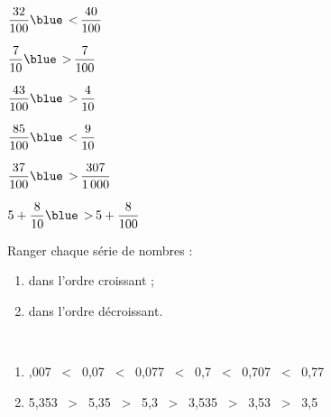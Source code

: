 \begin{colonne*exercice}
\begin{corrige}
   \begin{colenumerate}{2}
      \item $\dfrac{32}{100} {\blue\,<\,} \dfrac{40}{100}$ \medskip
      \item $\dfrac{7}{10} {\blue\,>\,} \dfrac{7}{100}$ \medskip
      \item $\dfrac{43}{100} {\blue\,>\,} \dfrac{4}{10}$ \medskip
      \item $\dfrac{85}{100} {\blue\,<\,} \dfrac{9}{10}$
      \item $\dfrac{37}{100} {\blue\,>\,} \dfrac{307}{1\,000}$
      \item $5+\dfrac{8}{10} {\blue\,>\,} 5+\dfrac{8}{100}$
   \end{colenumerate}
\end{corrige}

\bigskip


\begin{exercice} %
   Ranger chaque série de nombres :
   \begin{enumerate}
      \item dans l'ordre croissant ; \\ [1mm]
         \;  \;  \;  \;  \;  \medskip
      \item dans l'ordre décroissant. \\ [1mm]
         \;  \;  \;  \;  \;  \medskip
   \end{enumerate}
\end{exercice}

\begin{corrige}
   \ \\ [-5mm]
   \begin{enumerate}
      \item {},007 \, < \, 0,07 \, < \, 0,077 \, < \, 0,7 \, < \, 0,707 \, < \, 0,77 \smallskip
      \item 5,353 \, > \, 5,35 \, > \, 5,3 \, > \, 3,535 \, > \, 3,53 \, > \, 3,5
   \end{enumerate}
\end{corrige}

\bigskip



\end{colonne*exercice}
